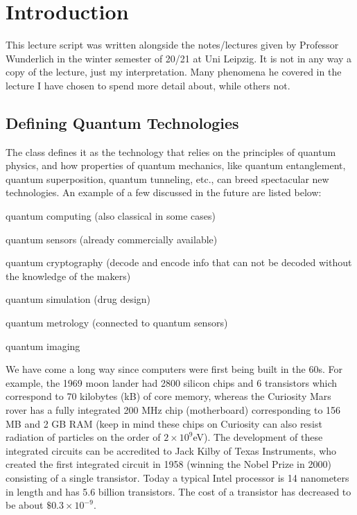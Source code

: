 
\chapter{Introduction}\label{ch:introduction}

This lecture script was written alongside the notes/lectures given by Professor Wunderlich in the winter semester of 20/21 at Uni Leipzig.
It is not in any way a copy of the lecture, just my interpretation.
Many phenomena he covered in the lecture I have chosen to spend more detail about, while others not.

\section{Defining Quantum Technologies}\label{sec:dqt}
The class defines it as the technology that relies on the principles of quantum physics, and how properties of quantum mechanics, like quantum entanglement, quantum superposition, quantum tunneling, etc., can breed spectacular new technologies.
An example of a few discussed in the future are listed below:
\begin{myitemize}
	\item quantum computing (also classical in some cases)
	\item quantum sensors (already commercially available)
	\item quantum cryptography (decode and encode info that can not be decoded without the knowledge of the makers)
 	\item quantum simulation (drug design)
	\item quantum metrology (connected to quantum sensors)
	\item quantum imaging
\end{myitemize}

We have come a long way since computers were first being built in the 60s.
For example, the 1969 moon lander had 2800 silicon chips and 6 transistors which correspond to 70 kilobytes (kB) of core memory, whereas the Curiosity Mars rover has a fully integrated 200 MHz chip (motherboard) corresponding to 156 MB and 2 GB RAM (keep in mind these chips on Curiosity can also resist radiation of particles on the order of $2\times 10^9$eV).
The development of these integrated circuits can be accredited to Jack Kilby of Texas Instruments, who created the first integrated circuit in 1958 (winning the Nobel Prize in 2000) consisting of a single transistor.
Today a typical Intel processor is 14 nanometers in length and has 5.6 billion transistors.
The cost of a transistor has decreased to be about $\$0.3\times 10^{-9}$.

